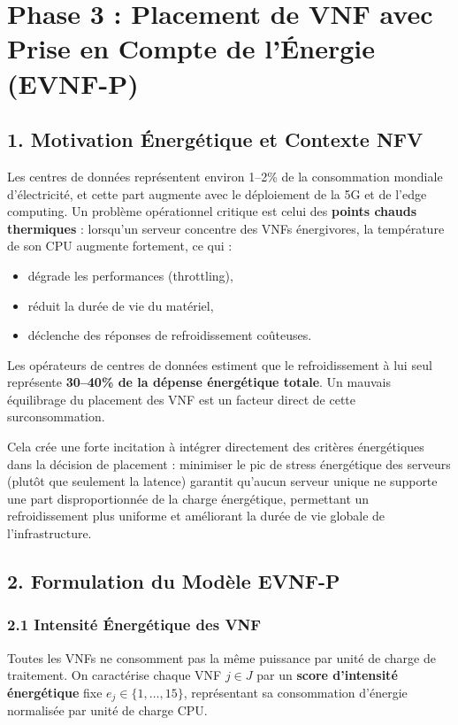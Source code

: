\documentclass{article}
\begin{document}
\section{Phase 3 : Placement de VNF avec Prise en Compte de l'Énergie (EVNF-P)}

\subsection{1. Motivation Énergétique et Contexte NFV}

Les centres de données représentent environ 1--2\% de la consommation mondiale d'électricité, et cette part augmente avec le déploiement de la 5G et de l'edge computing. Un problème opérationnel critique est celui des \textbf{points chauds thermiques} : lorsqu'un serveur concentre des VNFs énergivores, la température de son CPU augmente fortement, ce qui :
\begin{itemize}
    \item dégrade les performances (throttling),
    \item réduit la durée de vie du matériel,
    \item déclenche des réponses de refroidissement coûteuses.
\end{itemize}

Les opérateurs de centres de données estiment que le refroidissement à lui seul représente \textbf{30--40\% de la dépense énergétique totale}. Un mauvais équilibrage du placement des VNF est un facteur direct de cette surconsommation.

Cela crée une forte incitation à intégrer directement des critères énergétiques dans la décision de placement : minimiser le pic de stress énergétique des serveurs (plutôt que seulement la latence) garantit qu'aucun serveur unique ne supporte une part disproportionnée de la charge énergétique, permettant un refroidissement plus uniforme et améliorant la durée de vie globale de l'infrastructure.

\subsection{2. Formulation du Modèle EVNF-P}

\subsubsection{2.1 Intensité Énergétique des VNF}

Toutes les VNFs ne consomment pas la même puissance par unité de charge de traitement. On caractérise chaque VNF $j \in J$ par un \textbf{score d'intensité énergétique} fixe $e_j \in \{1, \ldots, 15\}$, représentant sa consommation d'énergie normalisée par unité de charge CPU.
\end{document}
